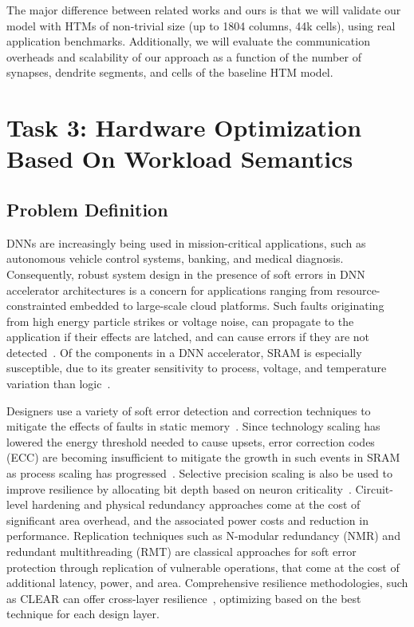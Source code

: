 The major difference between related works and ours is that we will validate our model with HTMs of non-trivial size (up to 1804 columns, 44k cells), using real application benchmarks.
Additionally, we will evaluate the communication overheads and scalability of our approach as a function of the number of synapses, dendrite segments, and cells of the baseline HTM model.

\section{Task 3: Hardware Optimization Based On Workload Semantics} 

\subsection{Problem Definition}

DNNs are increasingly being used in mission-critical applications, such as autonomous vehicle control systems, banking, and medical diagnosis.
Consequently, robust system design in the presence of soft errors in DNN accelerator architectures is a concern for applications ranging from resource-constrainted embedded to large-scale cloud platforms.
Such faults originating from high energy particle strikes or voltage noise, can propagate to the application if their effects are latched, and can cause errors if they are not detected~\cite{blome2006cost}.
Of the components in a DNN accelerator, SRAM is especially susceptible, due to its greater sensitivity to process, voltage, and temperature variation than logic~\cite{mitra2005robust}.

Designers use a variety of soft error detection and correction techniques to mitigate the effects of faults in static memory~\cite{mitra2005robust}.
Since technology scaling has lowered the energy threshold needed to cause upsets, error correction codes (ECC) are becoming insufficient to mitigate the growth in such events in SRAM as process scaling has progressed~\cite{ganapathy2017characterizing}.
Selective precision scaling is also be used to improve resilience by allocating bit depth based on neuron criticality~\cite{venkataramani2014axnn, koster2017flexpoint}.
Circuit-level hardening and physical redundancy approaches come at the cost of significant area overhead, and the associated power costs and reduction in performance.
Replication techniques such as N-modular redundancy (NMR) and redundant multithreading (RMT) are classical approaches for soft error protection through replication of vulnerable operations, that come at the cost of additional latency, power, and area.
Comprehensive resilience methodologies, such as CLEAR can offer cross-layer resilience~\cite{cheng2017tolerating}, optimizing based on the best technique for each design layer.

